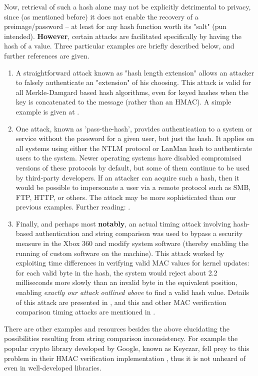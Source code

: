 \documentclass{article}
\begin{document}
Now, retrieval of such a hash alone may not be explicitly detrimental to privacy, since (as mentioned before) it does not enable the recovery of a preimage/password -- at least for any hash function worth its "salt" (pun intended). \textbf{However}, certain attacks are facilitated specifically by having the hash of a value. Three particular examples are briefly described below, and further references are given.
\begin{enumerate}
  \item A straightforward attack known as "hash length extension" \cite{whitehathash} allows an attacker to falsely authenticate an "extension" of his choosing. This attack is valid for all Merkle-Damgard based hash algorithms, even for keyed hashes when the key is concatenated to the message (rather than an HMAC). A simple example is given at \cite{wikiexthash}.
  \item One attack, known as 'pass-the-hash', provides authentication to a system or service without the password for a given user, but just the hash. It applies on all systems using either the NTLM protocol or LanMan hash to authenticate users to the system. \cite{wikipasshash} Newer operating systems have disabled compromised versions of these protocols by default, but some of them continue to be used by third-party developers. If an attacker can acquire such a hash, then it would be possible to impersonate a user via a remote protocol such as SMB, FTP, HTTP, or others. The attack may be more sophisticated than our previous examples. Further reading: \cite{passhash}.
  \item Finally, and perhaps most \textbf{notably}, an actual timing attack involving hash-based authentication and string comparison was used to bypass a security measure in the Xbox 360 and modify system software (thereby enabling the running of custom software on the machine). This attack worked by exploiting time differences in verifying valid MAC values for kernel updates: for each valid byte in the hash, the system would reject about 2.2 milliseconds more slowly than an invalid byte in the equivalent position, enabling \textit{exactly our attack outlined above} to find a valid hash value. Details of this attack are presented in \cite{xbox}, and this and other MAC verification comparison timing attacks are mentioned in \cite{xboxbook}.
\end{enumerate}

There are other examples and resources besides the above elucidating the possibilities resulting from string comparison inconsistency. For example the popular crypto library developed by Google, known as Keyczar, fell prey to this problem in their HMAC verification implementation \cite{keyczar}, thus it is not unheard of even in well-developed libraries.
\end{document}
